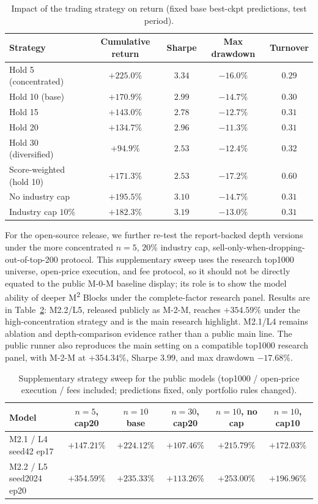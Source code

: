 \documentclass[a4paper,11pt]{article}
\begin{document}
\begin{table}[H]
\centering
\caption{Impact of the trading strategy on return (fixed base best-ckpt
predictions, test period).}
\label{tab:strategy}
\begin{tabular}{lcccc}
\toprule
Strategy & Cumulative return & Sharpe & Max drawdown & Turnover \\
\midrule
Hold 5 (concentrated)    & $+225.0\%$ & $3.34$ & $-16.0\%$ & $0.29$ \\
Hold 10 (base)   & $+170.9\%$ & $2.99$ & $-14.7\%$ & $0.30$ \\
Hold 15           & $+143.0\%$ & $2.78$ & $-12.7\%$ & $0.31$ \\
Hold 20           & $+134.7\%$ & $2.96$ & $-11.3\%$ & $0.31$ \\
Hold 30 (diversified)   & $+94.9\%$  & $2.53$ & $-12.4\%$ & $0.32$ \\
Score-weighted (hold 10)  & $+171.3\%$ & $2.53$ & $-17.2\%$ & $0.60$ \\
No industry cap           & $+195.5\%$ & $3.10$ & $-14.7\%$ & $0.31$ \\
Industry cap $10\%$      & $+182.3\%$ & $3.19$ & $-13.0\%$ & $0.31$ \\
\bottomrule
\end{tabular}
\end{table}

For the open-source release, we further re-test the report-backed depth
versions under the more concentrated $n=5$, $20\%$ industry cap,
sell-only-when-dropping-out-of-top-200 protocol. This supplementary sweep uses
the research top1000 universe, open-price execution, and fee protocol, so it
should not be directly equated to the public M-0-M baseline display; its role
is to show the model ability of deeper M\textsuperscript{2} Blocks under the
complete-factor research panel. Results are in
Table~\ref{tab:release-strategy-sweep}: M2.2/L5, released publicly as M-2-M,
reaches $+354.59\%$ under the high-concentration strategy and is the main
research highlight. M2.1/L4 remains ablation and depth-comparison evidence
rather than a public main line. The public 
runner also reproduces the main setting on a compatible top1000 research
panel, with M-2-M at $+354.34\%$, Sharpe
$3.99$, and max drawdown $-17.68\%$.

\begin{table}[H]
\centering
\caption{Supplementary strategy sweep for the public models (top1000 /
open-price execution / fees included; predictions fixed, only portfolio rules
changed).}
\label{tab:release-strategy-sweep}
\begin{tabular}{lccccc}
\toprule
Model & $n=5$, cap20 & $n=10$ base & $n=30$, cap20 & $n=10$, no cap & $n=10$, cap10 \\
\midrule
M2.1 / L4 seed42 ep17   & $+147.21\%$ & $+224.12\%$ & $+107.46\%$ & $+215.79\%$ & $+172.03\%$ \\
M2.2 / L5 seed2024 ep20 & $\mathbf{+354.59\%}$ & $+235.33\%$ & $+113.26\%$ & $+253.00\%$ & $+196.96\%$ \\
\bottomrule
\end{tabular}
\end{table}
\end{document}
